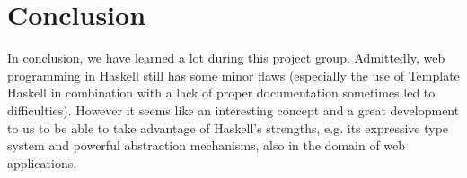\documentclass[a4paper]{easychair}
\begin{document}
\section{Conclusion}

In conclusion, we have learned a lot during this project group. Admittedly, web programming in Haskell still has some minor flaws (especially the use of Template Haskell in combination with a lack of proper documentation sometimes led to difficulties). However it seems like an interesting concept and a great development to us to be able to take advantage of Haskell's strengths, e.g. its expressive type system and powerful abstraction mechanisms, also in the domain of web applications.


%
\label{sect:bib}

%
%
%
%


\end{document}
